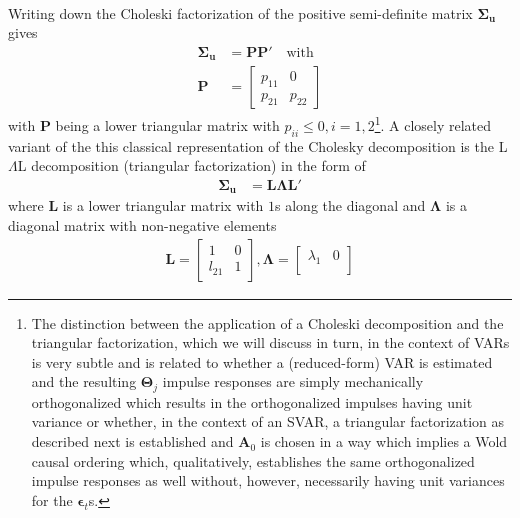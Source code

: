 \documentclass[a4paper,11pt,listof=nochaptergap,oneside,pointednumbers,bibtotoc,bigheadings,liststotoc]{scrbook}
\theoremstyle{mysatz}
\theoremstyle{mydefinition}
\theoremstyle{mybemerkung}
\newcommand{\vect}[1]{\boldsymbol{\mathbf{#1}}}
\begin{document}
\begin{itemize}
\\
Writing down the Choleski factorization of the positive semi-definite matrix $\vect{\Sigma_u}$ gives
\begin{equation} \label{eq:svar14}
\begin{split}
 		\vect{\Sigma_u} & = \vect{P}\vect{P'} \quad \text{with} \\
		\vect{P} & = \begin{bmatrix}
    							p_{11} & 0 \\
							p_{21} & p_{22}
 							\end{bmatrix}
\end{split}								
\end{equation}
with $\vect{P}$ being a lower triangular matrix with $p_{ii} \leq 0, i = 1, 2$\footnote{The distinction between the application of a Choleski decomposition and the triangular factorization, which we will discuss in turn, in the context of VARs is very subtle and is related to whether a (reduced-form) VAR is estimated and the resulting $\vect{\Theta}_j$ impulse responses are simply mechanically orthogonalized which results in the orthogonalized impulses having unit variance or whether, in the context of an SVAR, a triangular factorization as described next is established and $\vect{A}_0$ is chosen in a way which implies a Wold causal ordering which, qualitatively, establishes the same orthogonalized impulse responses as well without, however, necessarily having unit variances for the $\vect{\epsilon}_t$s.}. A closely related variant of the this classical representation of the Cholesky decomposition is the L$\Lambda$L decomposition (triangular factorization) in the form of 
\begin{equation} \label{eq:svar15}
\begin{split}
 		\vect{\Sigma_u} & = \vect{L}\vect{\Lambda}\vect{L'}
\end{split}								
\end{equation}
where $\vect{L}$ is a lower triangular matrix with $1$s along the diagonal and $\vect{\Lambda}$ is a diagonal matrix with non-negative elements
\begin{equation} \label{eq:svar16}
\begin{split}
	\vect{L} =  \begin{bmatrix}
    				1 & 0 \\
				l_{21} & 1 
 				\end{bmatrix}, 
				\vect{\Lambda} = 
					\begin{bmatrix}
    					\lambda_1 & 0 \\

\end{bmatrix}
\end{split}
\end{equation}
\end{itemize}
\end{document}
